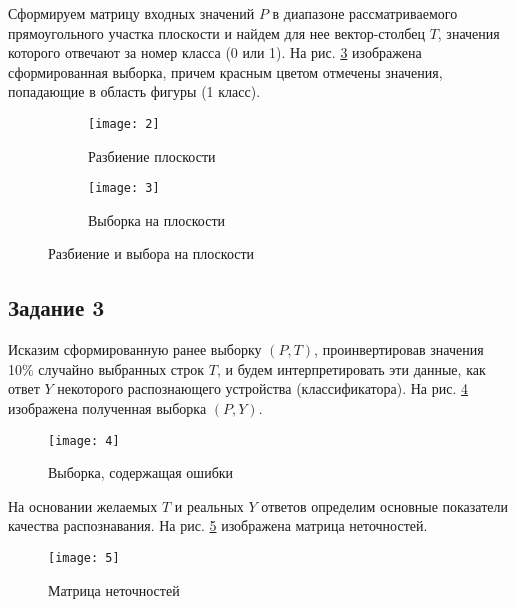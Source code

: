 Сформируем матрицу входных значений $P$ в диапазоне рассматриваемого прямоугольного участка плоскости и найдем для нее вектор-столбец $T$, значения которого отвечают за номер класса (0 или 1). На рис. \ref{fig:two_classes_sample} изображена сформированная выборка, причем красным цветом отмечены значения, попадающие в область фигуры (1 класс).

\begin{figure}[H]
\begin{center}
	\begin{subfigure}[b]{0.49\textwidth}
		\texttt{[image: 2]}
		\caption{Разбиение плоскости}
		\label{fig:two_classes_plane_splitting}
	\end{subfigure}
	\begin{subfigure}[b]{0.49\textwidth}
		\texttt{[image: 3]}
		\caption{Выборка на плоскости}
		\label{fig:two_classes_sample}
	\end{subfigure}
	\caption{Разбиение и выбора на плоскости}
\end{center}
\end{figure}

\subsection{Задание 3}

Исказим сформированную ранее выборку $(P, T)$, проинвертировав значения 10\% случайно выбранных строк $T$, и будем интерпретировать эти данные, как ответ $Y$ некоторого распознающего устройства (классификатора). На рис. \ref{fig:two_classes_noise} изображена полученная выборка $(P, Y)$.

\begin{figure}[H]
\begin{center}
	\texttt{[image: 4]}
	\caption{Выборка, содержащая ошибки}
	\label{fig:two_classes_noise}
\end{center}
\end{figure}

На основании желаемых $T$ и реальных $Y$ ответов определим основные показатели качества распознавания. На рис. \ref{fig:two_classes_conf_matrix} изображена матрица неточностей.

\begin{figure}[H]
\begin{center}
	\texttt{[image: 5]}
	\caption{Матрица неточностей}
	\label{fig:two_classes_conf_matrix}
\end{center}
\end{figure}

